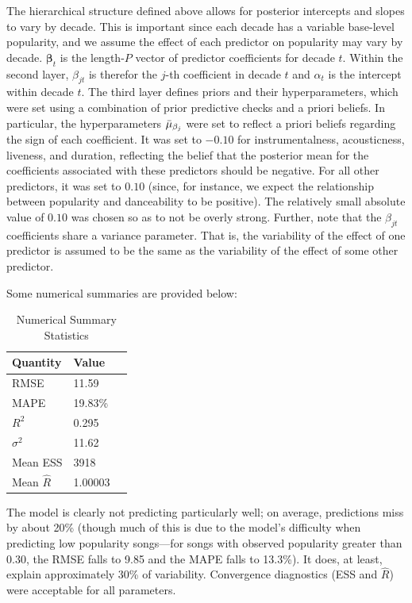 \documentclass[12pt, twoside]{article}
\begin{document}
The hierarchical structure defined above allows for posterior intercepts and slopes to vary by decade. This is important since each decade has a variable base-level popularity, and we assume the effect of each predictor on popularity may vary by decade. $\bm{\beta}_{t}$ is the length-$P$ vector of predictor coefficients for decade $t$. Within the second layer, $\beta_{jt}$ is therefor the $j$-th coefficient in decade $t$ and $\alpha_t$ is the intercept within decade $t$. The third layer defines priors and their hyperparameters, which were set using a combination of prior predictive checks and a priori beliefs. In particular, the hyperparameters $\Bar{\mu}_{\beta_{j}}$ were set to reflect a priori beliefs regarding the sign of each coefficient. It was set to $-0.10$ for instrumentalness, acousticness, liveness, and duration, reflecting the belief that the posterior mean for the coefficients associated with these predictors should be negative. For all other predictors, it was set to $0.10$ (since, for instance, we expect the relationship between popularity and danceability to be positive). The relatively small absolute value of $0.10$ was chosen so as to not be overly strong. Further, note that the $\beta_{jt}$ coefficients share a variance parameter. That is, the variability of the effect of one predictor is assumed to be the same as the variability of the effect of some other predictor. 

Some numerical summaries are provided below:

\begin{table}[H]
\centering
\caption{Numerical Summary Statistics}
\label{tab:results}
\def\arraystretch{1.5}
\begin{tabular}{l  p{2cm}  p{3cm}} %
\hline
Quantity & Value \\ \hline
RMSE & 11.59 \\
MAPE & 19.83\% \\
$R^2$ & 0.295 \\
$\sigma^2$ & 11.62 \\
Mean ESS & 3918 \\
Mean $\hat{R}$ & 1.00003
\label{table:model_sum}
\end{tabular}
\end{table}

The model is clearly not predicting particularly well; on average, predictions miss by about 20\% (though much of this is due to the model's difficulty when predicting low popularity songs---for songs with observed popularity greater than 0.30, the RMSE falls to 9.85 and the MAPE falls to 13.3\%). It does, at least, explain approximately 30\% of variability. Convergence diagnostics (ESS and $\hat{R}$) were acceptable for all parameters. 
\end{document}
